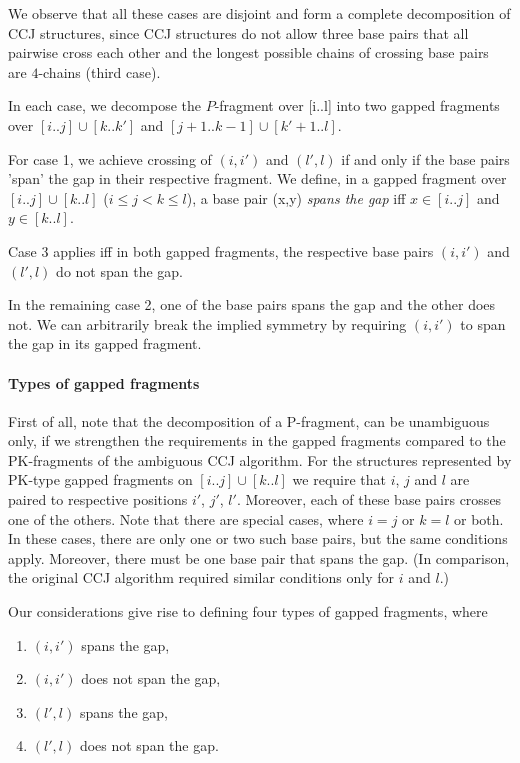 \documentclass[11pt]{article} %
\def\mySecStr#1{\expandafter {\tt #1}\& }
\def\mySecStrAll#1{\ifx#1\mySecStrAll\else\mySecStr#1\expandafter\mySecStrAll\fi}
\newcommand{\RNA}[3][]{
\begin{tikzpicture}[baseline={([yshift=-.5ex]rna)}]
  \matrix[matrix of nodes,nodes=cell,ampersand replacement=\&] (rna){
		\mySecStrAll #2 \mySecStrAll\\
		};
\ifthenelse{\equal{#3}{}}{}{%
	\foreach \x/\y in {#3}{\draw (rna-1-\x) edge[bp] (rna-1-\y);}%
}
\ifthenelse{\equal{#1}{}}{}{%
		\foreach \x/\y in {#1}{\draw (rna-1-\x) edge[altbp] (rna-1-\y);}%
		}
\end{tikzpicture}}
\begin{document}
We observe that all these cases are disjoint and form a complete decomposition of CCJ structures, since CCJ structures do not allow three base pairs that all pairwise cross each other and the longest possible chains of crossing base pairs are $4$-chains (third case).

In each case, we decompose the $P$-fragment over [i..l] into two gapped fragments over $[i..j]\cup[k..k']$ and $[j+1..k-1]\cup[k'+1..l]$. 

%

For case 1, we achieve crossing of $(i,i')$ and $(l',l)$ if and only if the
base pairs 'span' the gap in their respective fragment. We define, in a gapped
fragment over $[i..j]\cup[k..l]$ ($i\leq j<k\leq l$), a base pair (x,y)
\emph{spans the gap} iff $x\in[i..j]$ and $y\in[k..l]$.

Case 3 applies iff in both gapped fragments, the respective base pairs $(i,i')$ and $(l',l)$ do not span the gap.

In the remaining case 2, one of the base pairs spans the gap and the other does
not. We can arbitrarily break the implied symmetry by requiring $(i,i')$ to
span the gap in its gapped fragment.

\paragraph{Types of gapped fragments}

First of all, note that the decomposition of a P-fragment, can be unambiguous
only, if we strengthen the requirements in the gapped fragments compared to the
PK-fragments of the ambiguous CCJ algorithm.  For the structures represented by
PK-type gapped fragments on $[i..j]\cup[k..l]$ we require that $i$, $j$ and $l$
are paired to respective positions $i'$, $j'$, $l'$. Moreover, each of these
base pairs crosses one of the others.  Note that there are special
cases, where $i=j$ or $k=l$ or both. In these cases, there are only one or two
such base pairs, but the same conditions apply. Moreover, there must be one
base pair that spans the gap. (In comparison, the original CCJ algorithm
required similar conditions only for $i$ and $l$.)

Our considerations give rise to defining four types of gapped
fragments, where
\begin{enumerate}
\item $(i,i')$ spans the gap,
\item $(i,i')$ does not span the gap,
\item $(l',l)$ spans the gap,
\item $(l',l)$ does not span the gap.
\end{enumerate}
\end{document}
